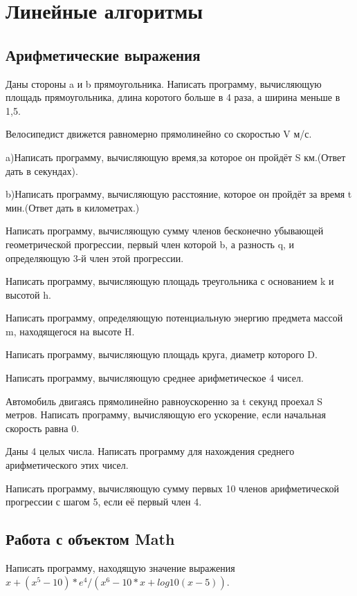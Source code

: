 \section{Линейные алгоритмы}

\subsection{Арифметические выражения}

\task Даны стороны a и b прямоугольника. Написать программу,
вычисляющую площадь прямоугольника, длина коротого больше в 4 раза, а
ширина меньше в 1,5.

\task Велосипедист движется равномерно прямолинейно со скоростью V
м/с.

a)Написать программу, вычисляющую время,за которое он пройдёт S
км.(Ответ дать в секундах).

b)Написать программу, вычисляющую расстояние, которое он пройдёт за
время t мин.(Ответ дать в километрах.)

\task Написать программу, вычисляющую сумму членов бесконечно
убывающей геометрической прогрессии, первый член которой b, а разность
q, и определяющую 3-й член этой прогрессии.

\task Написать программу, вычисляющую площадь треугольника с
основанием k и высотой h.

\task Написать программу, определяющую потенциальную энергию предмета
массой m, находящегося на высоте H.

\task Написать программу, вычисляющую площадь круга, диаметр которого
D.

\task Написать программу, вычисляющую среднее арифметическое 4 чисел.

\task Автомобиль двигаясь прямолинейно равноускоренно за t секунд
проехал S метров. Написать программу, вычисляющую его ускорение, если
начальная скорость равна 0.

\task Даны 4 целых числа. Написать программу для нахождения среднего
арифметического этих чисел.

\task Написать программу, вычисляющую сумму первых 10 членов
арифметической прогрессии с шагом 5, если её первый член 4.


\subsection{Работа с объектом Math}

\task Написать программу, находящую значение выражения
$x+(x^5-10)*e^4/(x^6-10*x+log10(x-5))$.

